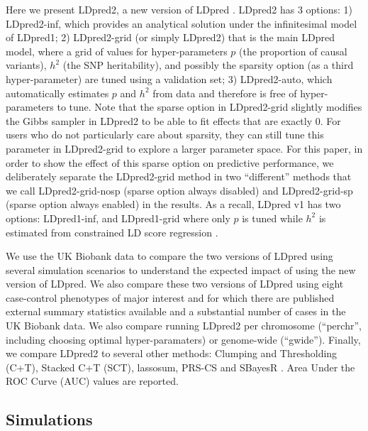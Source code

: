 \documentclass{bioinfo}
\begin{document}
Here we present LDpred2, a new version of LDpred \cite[]{vilhjalmsson2015modeling}.
LDpred2 has 3 options: 1) LDpred2-inf, which provides an analytical solution under the infinitesimal model of LDpred1; 2) LDpred2-grid (or simply LDpred2) that is the main LDpred model, where a grid of values for hyper-parameters $p$ (the proportion of causal variants), $h^2$ (the SNP heritability), and possibly the sparsity option (as a third hyper-parameter) are tuned using a validation set; 3) LDpred2-auto, which automatically estimates $p$ and $h^2$ from data and therefore is free of hyper-parameters to tune.
Note that the sparse option in LDpred2-grid slightly modifies the Gibbs sampler in LDpred2 to be able to fit effects that are exactly 0.
For users who do not particularly care about sparsity, they can still tune this parameter in LDpred2-grid to explore a larger parameter space. 
For this paper, in order to show the effect of this sparse option on predictive performance, we deliberately separate the LDpred2-grid method in two ``different'' methods that we call LDpred2-grid-nosp (sparse option always disabled) and LDpred2-grid-sp (sparse option always enabled) in the results.
As a recall, LDpred v1 has two options: LDpred1-inf, and LDpred1-grid where only $p$ is tuned while $h^2$ is estimated from constrained LD score regression \cite[]{bulik2015ld}.

We use the UK Biobank data to compare the two versions of LDpred using several simulation scenarios to understand the expected impact of using the new version of LDpred. We also compare these two versions of LDpred using eight case-control phenotypes of major interest and for which there are published external summary statistics available and a substantial number of cases in the UK Biobank data. 
We also compare running LDpred2 per chromosome (``perchr'', including choosing optimal hyper-paramaters) or genome-wide (``gwide'').
Finally, we compare LDpred2 to several other methods: Clumping and Thresholding (C+T), Stacked C+T (SCT), lassosum, PRS-CS and SBayesR \cite[]{prive2019making,mak2017polygenic,ge2019polygenic,lloyd2019improved}.
Area Under the ROC Curve (AUC) values are reported.


\subsection*{Simulations}
\end{document}
